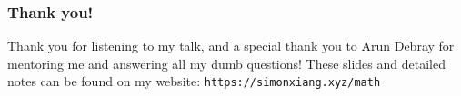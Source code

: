 \documentclass[xcolor=dvipsnames]{beamer}
\begin{document}

\begin{frame}
    \frametitle{Thank you!} 
Thank you for listening to my talk, and a special thank you to Arun Debray for mentoring me and answering all my dumb questions! These slides and detailed notes can be found on my website: \texttt{https://simonxiang.xyz/math} 
\end{frame}
\end{document}
